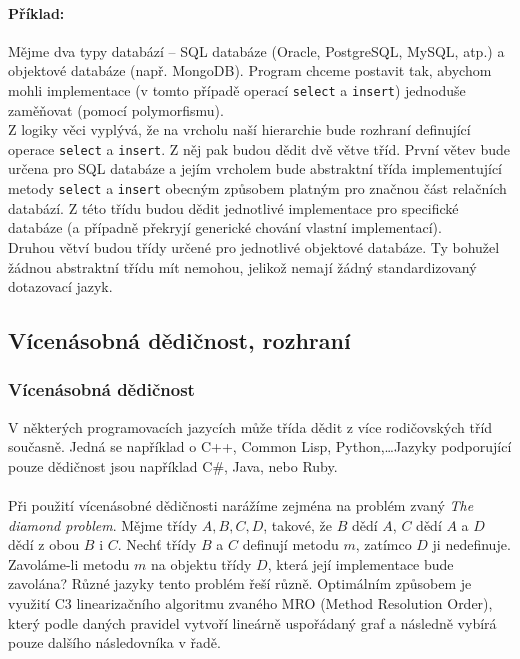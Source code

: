 \documentclass[10pt,a4paper]{article}
\begin{document}
			\paragraph{Příklad:} Mějme dva typy databází – SQL databáze (Oracle, PostgreSQL, MySQL, atp.) a objektové databáze (např. MongoDB). Program chceme postavit tak, abychom mohli implementace (v tomto případě operací \texttt{select} a \texttt{insert}) jednoduše zaměňovat (pomocí polymorfismu).
			\\
			Z logiky věci vyplývá, že na vrcholu naší hierarchie bude rozhraní definující operace \texttt{select} a \texttt{insert}. Z něj pak budou dědit dvě větve tříd. První větev bude určena pro SQL databáze a jejím vrcholem bude abstraktní třída implementující metody \texttt{select} a \texttt{insert} obecným způsobem platným pro značnou část relačních databází. Z této třídu budou dědit jednotlivé implementace pro specifické databáze (a případně překryjí generické chování vlastní implementací).
			\\
			Druhou větví budou třídy určené pro jednotlivé objektové databáze. Ty bohužel žádnou abstraktní třídu mít nemohou, jelikož nemají žádný standardizovaný dotazovací jazyk.

	\subsection{Vícenásobná dědičnost, rozhraní}
		\subsubsection{Vícenásobná dědičnost}
			\label{vicenasobna-dedicnost}
			V některých programovacích jazycích může třída dědit z více rodičovských tříd současně. Jedná se například o C++, Common Lisp, Python,\dots Jazyky podporující pouze  dědičnost jsou například C\#, Java, nebo Ruby.
			\\
			\\
			Při použití vícenásobné dědičnosti narážíme zejména na problém zvaný \textit{The diamond problem}. Mějme třídy $A, B, C, D$, takové, že $B$ dědí $A$, $C$ dědí $A$ a $D$ dědí z obou $B$ i $C$. Nechť třídy $B$ a $C$ definují metodu $m$, zatímco $D$ ji nedefinuje. Zavoláme-li metodu $m$ na objektu třídy $D$, která její implementace bude zavolána? Různé jazyky tento problém řeší různě. Optimálním způsobem je využití C3 linearizačního algoritmu zvaného MRO (Method Resolution Order), který podle daných pravidel vytvoří lineárně uspořádaný graf a následně vybírá pouze dalšího následovníka v řadě.
\end{document}

